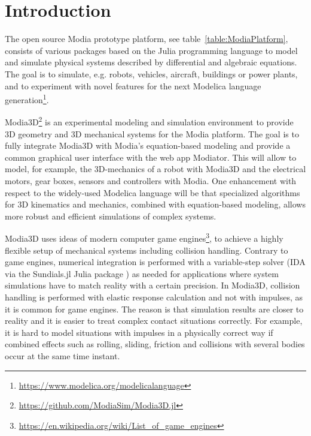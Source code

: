 \section{Introduction}

The open source Modia prototype platform, see table~\ref{table:ModiaPlatform}, consists of various packages
based on the Julia programming language \cite{bezanson2017julia} to model and simulate physical systems
described by differential and algebraic equations. The goal is
to simulate, e.g. robots, vehicles, aircraft, buildings or power plants,
and to experiment with novel features for the next Modelica\textsuperscript{\textcopyright} language
generation\footnote{\href{https://www.modelica.org/modelicalanguage}{https://www.modelica.org/modelicalanguage}}.

Modia3D\footnote{\href{https://github.com/ModiaSim/Modia3D.jl}{https://github.com/ModiaSim/Modia3D.jl}}
is an experimental modeling and simulation environment to provide 3D geometry and 3D mechanical systems
for the Modia platform. The goal is to fully integrate Modia3D with Modia's equation-based modeling and
provide a common graphical user interface with the web app Modiator. This will
allow to model, for example, the 3D-mechanics of a robot with Modia3D and the electrical motors, gear boxes,
sensors and controllers with Modia. One enhancement with respect to the widely-used Modelica language
will be that specialized algorithms for 3D kinematics and mechanics, combined with equation-based modeling,
allows more robust and efficient simulations of complex systems.

Modia3D uses ideas of modern computer
game engines\footnote{\href{https://en.wikipedia.org/wiki/List_of_game_engines}{https://en.wikipedia.org/wiki/List\_of\_game\_engines}},
to achieve a highly flexible setup of mechanical systems including collision handling. 
Contrary to game engines, numerical integration is performed with a variable-step solver
(IDA via the Sundials.jl Julia package \cite{Sundials2005,Rackauckas2017}) as needed for applications
where system simulations have to match reality with a certain precision.
In Modia3D, collision handling is performed with elastic response calculation and not
with impulses, as it is common for game engines. The reason is that simulation results are closer to reality
and it is easier to treat complex contact situations correctly. For example, it is hard to model situations
with impulses in a physically correct way if combined effects such as rolling, sliding, friction and 
collisions with several bodies occur at the same time instant. 

